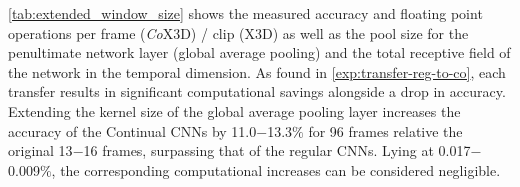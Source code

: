 \cref{tab:extended_window_size} shows the measured accuracy and floating point operations per frame (\textit{Co}X3D) / clip (X3D) as well as the pool size for the penultimate network layer (global average pooling) and the total receptive field of the network in the temporal dimension. 
As found in \cref{exp:transfer-reg-to-co}, each transfer results in significant computational savings alongside a drop in accuracy.
Extending the kernel size of the global average pooling layer increases the accuracy of the Continual CNNs by 11.0$-$13.3$\%$ for 96 frames relative the original 13$-$16 frames, surpassing that of the regular CNNs.
Lying at 0.017$-$0.009$\%$, the corresponding computational increases can be considered negligible. 





